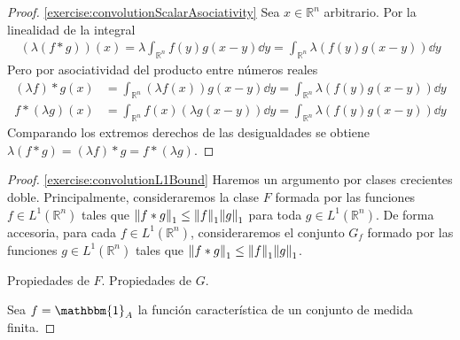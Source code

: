 \documentclass{article}
\newcommand{\characteristic}{\mathbbm{1}}
\newcommand{\realNumbers}{\mathbb{R}}
\newcommand{\integrableFunctions}{L^1(\realNumbers^n)}
\theoremstyle{remark}
\begin{document}
  \begin{proof}
    \ref{exercise:convolutionScalarAsociativity}
    Sea \(x \in \realNumbers^n\) arbitrario.
    Por la linealidad de la integral
    \begin{align}
      (\lambda (f * g)) (x)
      =
      \lambda \int_{\realNumbers^n} f(y) g(x - y) \dd y
      =
      \int_{\realNumbers^n} \lambda (f(y) g(x - y)) \dd y
    \end{align}
    Pero por asociatividad del producto entre números reales
    \begin{align}
      (\lambda f) * g (x)
      &=
      \int_{\realNumbers^n} (\lambda f(x)) g(x - y) \dd y
      =
      \int_{\realNumbers^n} \lambda (f(y) g(x - y)) \dd y
      \\
      f * (\lambda g) (x)
      &=
      \int_{\realNumbers^n} f(x) (\lambda g(x - y)) \dd y
      =
      \int_{\realNumbers^n} \lambda (f(y) g(x - y)) \dd y      
    \end{align}
    Comparando los extremos derechos de las desigualdades se obtiene \(\lambda (f * g) = (\lambda f) * g = f * (\lambda g)\).
  \end{proof}

  \begin{proof}
    \ref{exercise:convolutionL1Bound}
    Haremos un argumento por clases crecientes doble.
    Principalmente, consideraremos la clase \(F\) formada por las funciones \(f \in \integrableFunctions\) tales que \(\norm{f * g}_1 \leq \norm{f}_1 \norm{g}_1\) para toda \(g \in \integrableFunctions\).
    De forma accesoria, para cada \(f \in \integrableFunctions\), consideraremos el conjunto \(G_f\) formado por las funciones \(g \in \integrableFunctions\) tales que \(\norm{f * g}_1 \leq \norm{f}_1 \norm{g}_1\).

    Propiedades de \(F\). Propiedades de \(G\).

    Sea \(f = \characteristic_A\) la función característica de un conjunto de medida finita.
  \end{proof}
\end{document}
